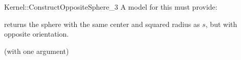 \begin{ccRefFunctionObjectConcept}{Kernel::ConstructOppositeSphere_3}
A model for this must provide:


{ returns the sphere with the same center and squared radius as
  $s$, but with opposite orientation.}

\ccRefines
{} (with one argument)

\ccSeeAlso
{} \\

\end{ccRefFunctionObjectConcept}
